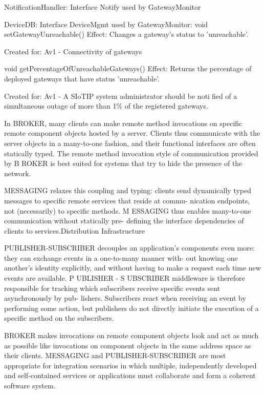             NotificationHandler:
                Interface Notify used by GatewayMonitor

            DeviceDB:
                Interface DeviceMgmt used by GatewayMonitor:
                    void setGatewayUnreachable()
                        Effect: Changes a gateway's status to 'unreachable'.
                        \item Created for: Av1 - Connectivity of gateways

                    void getPercentageOfUnreachableGateways()
                        Effect: Returns the percentage of deployed gateways that have status 'unreachable'.
                        \item Created for: Av1 - A SIoTIP system administrator should be notified of a simultaneous outage of more than 1\% of the registered gateways.


    In BROKER, many clients can make remote method invocations on
    specific remote component objects hosted by a server. Clients thus
    communicate with the server objects in a many-to-one fashion, and
    their functional interfaces are often statically typed. The remote
    method invocation style of communication provided by B ROKER is
    best suited for systems that try to hide the presence of the network.

    MESSAGING relaxes this coupling and typing: clients send dynamically
    typed messages to specific remote services that reside at commu-
    nication endpoints, not (necessarily) to specific methods. M ESSAGING
    thus enables many-to-one communication without statically pre-
    defining the interface dependencies of clients to services.Distribution Infrastructure

    PUBLISHER-SUBSCRIBER decouples an application’s components even
    more: they can exchange events in a one-to-many manner with-
    out knowing one another’s identity explicitly, and without having
    to make a request each time new events are available. P UBLISHER -
    S UBSCRIBER middleware is therefore responsible for tracking which
    subscribers receive specific events sent asynchronously by pub-
    lishers. Subscribers react when receiving an event by performing
    some action, but publishers do not directly initiate the execution of
    a specific method on the subscribers.

    BROKER makes invocations
    on remote component objects look and act as much as possible
    like invocations on component objects in the same address space
    as their clients. MESSAGING and PUBLISHER-SUBSCRIBER are most appropriate
    for integration scenarios in which multiple, independently
    developed and self-contained services or applications must collaborate
    and form a coherent software system.

